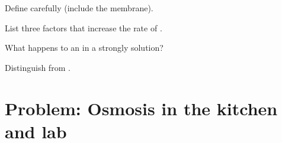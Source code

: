 \begin{exercise}[$\star$]\label{exo:g8:diffusion:2}
Define  carefully (include the membrane).
\end{exercise}

\begin{exercise}[$\star$]\label{exo:g8:diffusion:3}
List three factors that increase the rate of .
\end{exercise}

\begin{exercise}[$\star$]\label{exo:g8:diffusion:4}
What happens to an   in a strongly  solution?
\end{exercise}

\begin{exercise}[$\star$]\label{exo:g8:diffusion:5}
Distinguish  from .
\end{exercise}

\section{Problem: Osmosis in the kitchen and lab}

